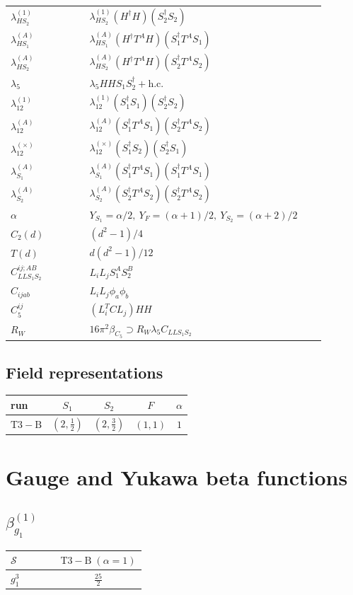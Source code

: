\documentclass[9pt]{article}
\begin{document}
\begin{longtable}{@{}p{0.23\linewidth}p{0.69\linewidth}@{}}
$\lambda_{HS_2}^{(1)}$ & $\lambda_{HS_2}^{(1)}(H^\dagger H)(S_2^\dagger S_2)$ \\
$\lambda_{HS_1}^{(A)}$ & $\lambda_{HS_1}^{(A)}(H^\dagger T^AH)(S_1^\dagger T^AS_1)$ \\
$\lambda_{HS_2}^{(A)}$ & $\lambda_{HS_2}^{(A)}(H^\dagger T^AH)(S_2^\dagger T^AS_2)$ \\
$\lambda_5$ & $\lambda_5HHS_1S_2^\dagger+\mathrm{h.c.}$ \\
$\lambda_{12}^{(1)}$ & $\lambda_{12}^{(1)}(S_1^\dagger S_1)(S_2^\dagger S_2)$ \\
$\lambda_{12}^{(A)}$ & $\lambda_{12}^{(A)}(S_1^\dagger T^AS_1)(S_2^\dagger T^AS_2)$ \\
$\lambda_{12}^{(\times)}$ & $\lambda_{12}^{(\times)}(S_1^\dagger S_2)(S_2^\dagger S_1)$ \\
$\lambda_{S_1}^{(A)}$ & $\lambda_{S_1}^{(A)}(S_1^\dagger T^A S_1)(S_1^\dagger T^A S_1)$ \\
$\lambda_{S_2}^{(A)}$ & $\lambda_{S_2}^{(A)}(S_2^\dagger T^A S_2)(S_2^\dagger T^A S_2)$ \\
$\alpha$ & $Y_{S_1}=\alpha/2,\ Y_F=(\alpha+1)/2,\ Y_{S_2}=(\alpha+2)/2$ \\
$C_2(d)$ & $(d^2-1)/4$ \\
$T(d)$ & $d(d^2-1)/12$ \\
$C_{LLS_1S_2}^{ij;AB}$ & $L_iL_jS_1^AS_2^B$ \\
$C_{ijab}$ & $L_iL_j\phi_a\phi_b$ \\
$C_5^{ij}$ & $(L_i^TCL_j)HH$ \\
$R_W$ & $16\pi^2\beta_{C_5}\supset R_W\lambda_5C_{LLS_1S_2}$ \\
\bottomrule
\end{longtable}
\subsection*{Field representations}
\begin{longtable}{@{}lcccc@{}}
\toprule
run & $S_1$ & $S_2$ & $F$ & $\alpha$ \\
\midrule
$\mathrm{T3-B}$ & $(2,\frac{1}{2})$ & $(2,\frac{3}{2})$ & $(1,1)$ & $1$ \\
\bottomrule
\end{longtable}
\section*{Gauge and Yukawa beta functions}
\subsection*{$ \beta_{g_1}^{(1)} $}
\begin{longtable}{@{}p{0.38\linewidth}c@{}}
\toprule
$\mathcal{S}$ & $ \mathrm{T3-B}\;(\alpha=1) $ \\
\midrule
$ g_1^3 $ & $ \frac{25}{2} $ \\
\bottomrule
\end{longtable}
\end{document}
